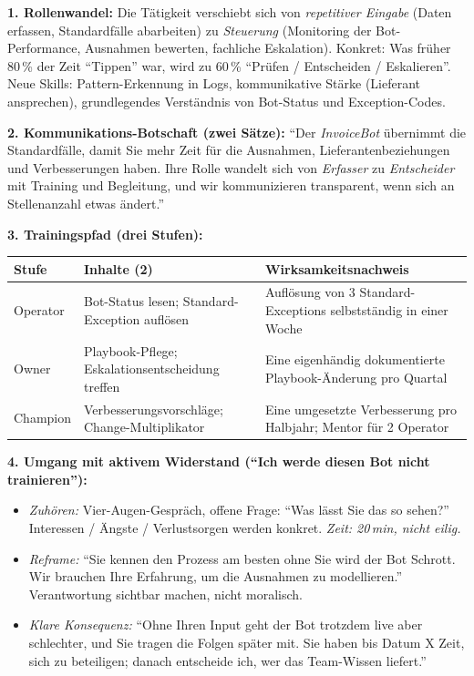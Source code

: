 \documentclass[11pt,a4paper,oneside]{article}
\begin{document}
\begin{loesungbox}
\textbf{1. Rollenwandel:} Die T\"atigkeit verschiebt sich von \emph{repetitiver Eingabe} (Daten erfassen, Standardf\"alle abarbeiten) zu \emph{Steuerung} (Monitoring der Bot-Performance, Ausnahmen bewerten, fachliche Eskalation). Konkret: Was fr\"uher 80\,\% der Zeit ``Tippen'' war, wird zu 60\,\% ``Pr\"ufen / Entscheiden / Eskalieren''. Neue Skills: Pattern-Erkennung in Logs, kommunikative St\"arke (Lieferant ansprechen), grundlegendes Verst\"andnis von Bot-Status und Exception-Codes.

\smallskip
\textbf{2. Kommunikations-Botschaft (zwei S\"atze):}
``Der \emph{InvoiceBot} \"ubernimmt die Standardf\"alle, damit Sie mehr Zeit f\"ur die Ausnahmen, Lieferantenbeziehungen und Verbesserungen haben. Ihre Rolle wandelt sich von \emph{Erfasser} zu \emph{Entscheider} \textendash{} mit Training und Begleitung, und wir kommunizieren transparent, wenn sich an Stellenanzahl etwas \"andert.''

\smallskip
\textbf{3. Trainingspfad (drei Stufen):}

\smallskip
\begin{tabularx}{\linewidth}{@{}p{2.4cm}XX@{}}
\toprule
\textbf{Stufe} & \textbf{Inhalte (2)} & \textbf{Wirksamkeitsnachweis} \\
\midrule
Operator  & Bot-Status lesen; Standard-Exception aufl\"osen        & Aufl\"osung von 3 Standard-Exceptions selbstst\"andig in einer Woche \\
Owner     & Playbook-Pflege; Eskalations\-entscheidung treffen      & Eine eigenh\"andig dokumentierte Playbook-\"Anderung pro Quartal \\
Champion  & Verbesserungs\-vorschl\"age; Change-Multiplikator       & Eine umgesetzte Verbesserung pro Halbjahr; Mentor f\"ur 2 Operator \\
\bottomrule
\end{tabularx}

\smallskip
\textbf{4. Umgang mit aktivem Widerstand (``Ich werde diesen Bot nicht trainieren''):}
\begin{itemize}
  \item \emph{Zuh\"oren:} Vier-Augen-Gespr\"ach, offene Frage: ``Was l\"asst Sie das so sehen?'' \textendash{} Interessen / \"Angste / Verlustsorgen werden konkret. \emph{Zeit: 20\,min, nicht eilig.}
  \item \emph{Reframe:} ``Sie kennen den Prozess am besten \textendash{} ohne Sie wird der Bot Schrott. Wir brauchen Ihre Erfahrung, um die Ausnahmen zu modellieren.'' Verantwortung sichtbar machen, nicht moralisch.
  \item \emph{Klare Konsequenz:} ``Ohne Ihren Input geht der Bot trotzdem live \textendash{} aber schlechter, und Sie tragen die Folgen sp\"ater mit. Sie haben bis Datum X Zeit, sich zu beteiligen; danach entscheide ich, wer das Team-Wissen liefert.''
\end{itemize}


\end{loesungbox}
\end{document}
